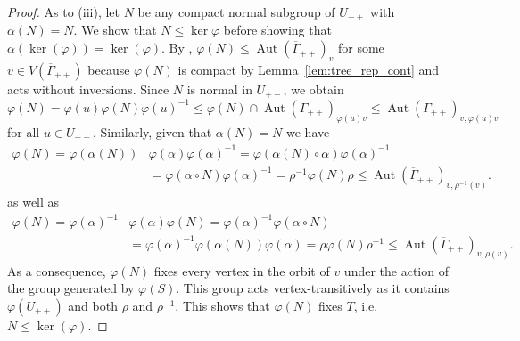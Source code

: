 \documentclass{article}
\DeclareMathOperator\Aut{Aut}
\theoremstyle{definition}
\begin{document}
\begin{proof}
As to (iii), let $N$ be any compact normal subgroup of $U_{++}$ with $\alpha(N)=N$. We show that $N\!\le\! \ker \varphi$ before showing that $\alpha(\ker(\varphi)) = \ker(\varphi)$. By \cite[Theorem 5.2]{FTN91}, $\varphi(N)\le\Aut(\overline{\Gamma}_{++})_{v}$ for some $v\in V(\overline{\Gamma}_{++})$ because $\varphi(N)$ is compact by Lemma~\ref{lem:tree_rep_cont} and acts without inversions. Since $N$ is normal in $U_{++}$, we obtain
\begin{displaymath}
\varphi(N)=\varphi(u)\varphi(N)\varphi(u)^{-1}\le\varphi(N)\cap\Aut(\overline{\Gamma}_{++})_{\varphi(u)v}\le\Aut(\overline{\Gamma}_{++})_{v,\varphi(u)v}
\end{displaymath}
for all $u\in U_{++}$. Similarly, given that $\alpha(N)=N$ we have
\begin{align*}
\varphi(N)=\varphi(\alpha(N))&\varphi(\alpha)\varphi(\alpha)^{-1}=\varphi(\alpha(N)\circ\alpha)\varphi(\alpha)^{-1} \\
&=\varphi(\alpha\circ N)\varphi(\alpha)^{-1}=\rho^{-1}\varphi(N)\rho\le\Aut(\overline{\Gamma}_{++})_{v,\rho^{-1}(v)}.
\end{align*}
as well as 
\begin{align*}
\varphi(N)=\varphi(\alpha)^{-1}&\varphi(\alpha)\varphi(N)=\varphi(\alpha)^{-1}\varphi(\alpha\circ N) \\
&=\varphi(\alpha)^{-1}\varphi(\alpha(N))\varphi(\alpha)=\rho\varphi(N)\rho^{-1}\le\Aut(\overline{\Gamma}_{++})_{v,\rho(v)}.
\end{align*}
As a consequence, $\varphi(N)$ fixes every vertex in the orbit of $v$ under the action of the group generated by $\varphi(S)$. This group acts vertex-transitively as it contains $\varphi(U_{++})$ and both $\rho$ and $\rho^{-1}$. This shows that $\varphi(N)$ fixes $T$, i.e. $N\le\ker(\varphi)$.


\end{proof}
\end{document}
